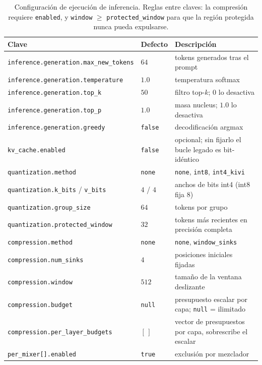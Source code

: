 \begin{table}[H]
\centering
\small
\begin{tabularx}{0.98\linewidth}{l l X}
\toprule
\textbf{Clave} & \textbf{Defecto} & \textbf{Descripción} \\
\midrule
\texttt{inference.generation.max\_new\_tokens} & $64$ & tokens generados tras el prompt \\
\texttt{inference.generation.temperature} & $1.0$ & temperatura softmax \\
\texttt{inference.generation.top\_k} & $50$ & filtro top-$k$; $0$ lo desactiva \\
\texttt{inference.generation.top\_p} & $1.0$ & masa nucleus; $1.0$ lo desactiva \\
\texttt{inference.generation.greedy} & \texttt{false} & decodificación argmax \\
\midrule
\texttt{kv\_cache.enabled} & \texttt{false} & opcional; sin fijarlo el bucle legado es bit-idéntico \\
\texttt{quantization.method} & \texttt{none} & \texttt{none}, \texttt{int8}, \texttt{int4\_kivi} \\
\texttt{quantization.k\_bits} / \texttt{v\_bits} & $4$ / $4$ & anchos de bits int4 (int8 fija 8) \\
\texttt{quantization.group\_size} & $64$ & tokens por grupo \\
\texttt{quantization.protected\_window} & $32$ & tokens más recientes en precisión completa \\
\texttt{compression.method} & \texttt{none} & \texttt{none}, \texttt{window\_sinks} \\
\texttt{compression.num\_sinks} & $4$ & posiciones iniciales fijadas \\
\texttt{compression.window} & $512$ & tamaño de la ventana deslizante \\
\texttt{compression.budget} & \texttt{null} & presupuesto escalar por capa; \texttt{null} = ilimitado \\
\texttt{compression.per\_layer\_budgets} & $[\,]$ & vector de presupuestos por capa, sobrescribe el escalar \\
\texttt{per\_mixer[].enabled} & \texttt{true} & exclusión por mezclador \\
\bottomrule
\end{tabularx}
\caption{Configuración de ejecución de inferencia. Reglas entre claves: la compresión requiere \texttt{enabled}, y \texttt{window} $\ge$ \texttt{protected\_window} para que la región protegida nunca pueda expulsarse.}
\label{tab:kv-config}
\end{table}


